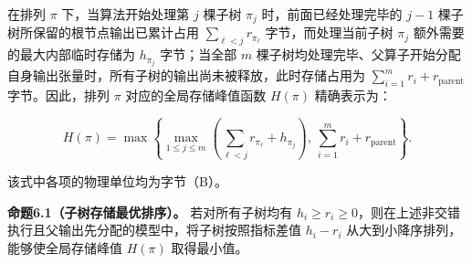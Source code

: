 \documentclass[anonymous,withtoc]{gmcm2026}
\begin{document}
在排列 \(\pi\) 下，当算法开始处理第 \(j\) 棵子树 \(\pi_j\) 时，前面已经处理完毕的 \(j - 1\) 棵子树所保留的根节点输出已累计占用 \(\sum_{\ell < j} r_{\pi_\ell}\) 字节，而处理当前子树 \(\pi_j\) 额外需要的最大内部临时存储为 \(h_{\pi_j}\) 字节；当全部 \(m\) 棵子树均处理完毕、父算子开始分配自身输出张量时，所有子树的输出尚未被释放，此时存储占用为 \(\sum_{i=1}^m r_i + r_{\mathrm{parent}}\) 字节。因此，排列 \(\pi\) 对应的全局存储峰值函数 \(H(\pi)\) 精确表示为：

\begin{equation}
H(\pi) = \max \left\{ \max_{1 \le j \le m} \left( \sum_{\ell < j} r_{\pi_\ell} + h_{\pi_j} \right), \ \sum_{i=1}^m r_i + r_{\mathrm{parent}} \right\}.
\end{equation}

该式中各项的物理单位均为字节（B）。

\textbf{命题6.1（子树存储最优排序）。} 若对所有子树均有 \(h_i \ge r_i \ge 0\)，则在上述非交错执行且父输出先分配的模型中，将子树按照指标差值 \(h_i - r_i\) 从大到小降序排列，能够使全局存储峰值 \(H(\pi)\) 取得最小值。
\end{document}
